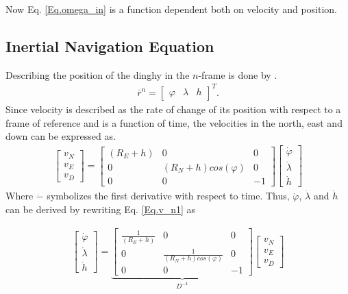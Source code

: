 \noindent Now Eq. \eqref{Eq.omega_in} is a function dependent both on velocity and position.

\subsection{Inertial Navigation Equation}
Describing the position of the dinghy in the $n$-frame is done by \cite{nonlinear}.
\begin{align}
\bar{r}^n=
\begin{bmatrix}
\varphi & \lambda & h
\end{bmatrix}^T.
\end{align}
Since velocity is described as the rate of change of its position with respect to a frame of reference and is a function of time, the velocities in the north, east and down can be expressed as.
\begin{align}
\begin{bmatrix}
v_N \\
v_E \\
v_D
\end{bmatrix}
=
\begin{bmatrix}
(R_E+h) & 0 & 0 \\
0 & (R_N+h)cos(\varphi) & 0\\
0 & 0 & -1
\end{bmatrix}
\begin{bmatrix}
\dot{\varphi}\\
\dot{\lambda}\\
\dot{h}
\end{bmatrix}
\label{Eq.v_n1}
\end{align}
Where $\dot{-}$ symbolizes the first derivative with respect to time. Thus, $\dot{\varphi}$, $\dot{\lambda}$ and $\dot{h}$ can be derived by rewriting Eq. \eqref{Eq.v_n1} as

\begin{align}
\begin{bmatrix}
\dot{\varphi}\\
\dot{\lambda}\\
\dot{h}
\end{bmatrix}
=
\underbrace{\begin{bmatrix}
\frac{1}{(R_E+h)} & 0 & 0 \\
0 & \frac{1}{(R_N+h)cos(\varphi)} & 0\\
0 & 0 & -1
\end{bmatrix}}_{D^{-1}}
\begin{bmatrix}
v_N \\
v_E \\
v_D
\end{bmatrix}
\label{Eq.v_n}
\end{align}

